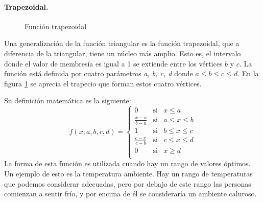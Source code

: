 \paragraph{Trapezoidal.}
\begin{figure}
	\vspace{-\baselineskip}
	\captionsetup{margin=0.2cm,justification=centering}	
	\caption{Función trapezoidal}
	\label{fig:trapmf}
\end{figure}

Una generalización de la función triangular es la función trapezoidal, que a diferencia de la triangular, tiene un núcleo más amplio. Esto es, el intervalo donde el valor de membresía es igual a 1 se extiende entre los vértices
$b$ y $c$.
La función está definida por cuatro parámetros \textit{a, b, c, d} donde $ a \leq b \leq c \leq  d$. En la figura \ref{fig:trapmf} se aprecia el trapecio que forman estos cuatro vértices.

Su definición matemática es la siguiente:
$$  f(x;a,b,c,d)= \left\lbrace \begin{array}{lcl}
						0		& \mbox{si} & x  \leq a \\ [.30cm]
{\displaystyle \frac{x-a}{b-a}} & \mbox{si} & a \leq x \leq b \\ [.45cm]
						1		& \mbox{si} & b \leq x \leq c \\ [.30cm]
{\displaystyle \frac{c-x}{c-b}} & \mbox{si} & c \leq x \leq d \\ [.45cm]
						0 		& \mbox{si} & x \geq d \\
\end{array}
\right.
$$
La forma de esta función es utilizada cuando hay un rango de valores óptimos. Un ejemplo de esto es la temperatura ambiente. Hay un rango de temperaturas que podemos considerar adecuadas, pero por debajo de este rango las personas comienzan a sentir frío, y por encima de él se consideraría un ambiente caluroso.

